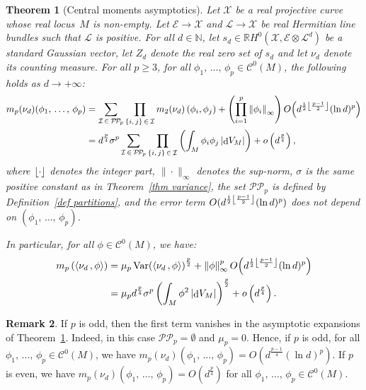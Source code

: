 \documentclass[10pt]{amsart}
\newtheorem{theo}{Theorem}[section]
\theoremstyle{definition}\newtheorem{defi}[theo]{Definition}\newtheorem{rema}[theo]{Remark}\newtheorem{exam}[theo]{Example}\newtheorem{exem}[theo]{Example}\newtheorem{nota}[theo]{Notation}
\DeclareMathOperator{\dmesure}{d}
\DeclareMathOperator{\Var}{Var}
\DeclarePairedDelimiter{\floor}{\lfloor}{\rfloor}
\newcommand{\E}{\mathcal{E}}
\newcommand{\I}{\mathcal{I}}
\newcommand{\X}{\mathcal{X}}
\renewcommand{\L}{\mathcal{L}}
\newcommand{\clC}{\mathcal{C}}
\newcommand{\pp}{\mathcal{P\!P}\!}
\newcommand{\N}{\mathbb{N}}
\newcommand{\R}{\mathbb{R}}
\newcommand{\norm}[1]{\left\lvert #1 \right\rvert}
\newcommand{\Norm}[1]{\left\lVert #1 \right\rVert}
\newcommand{\prsc}[2]{\left\langle #1\,, #2 \right\rangle}
\newcommand{\rmes}[1]{\norm{\dmesure\! V_{#1}}}
\newcommand{\var}[1]{\Var\!\left(#1 \right)}
\renewcommand{\H}{H^0(\X,\E \otimes \L^d)}
\renewcommand{\geq}{\geqslant}
\begin{document}
\begin{theo}[Central moments asymptotics]\label{thm main}
Let $\X$ be a real projective curve whose real locus~$M$ is non-empty. Let $\E \to \X$ and $\L \to \X$ be real Hermitian line bundles such that $\L$ is positive. For all $d \in \N$, let $s_d \in \R\H$ be a standard Gaussian vector, let $Z_d$ denote the real zero set of $s_d$ and let $\nu_d$ denote its counting measure. For all $p \geq 3$, for all $\phi_1,\,\dots,\,\phi_p \in \clC^0(M)$, the following holds as $d \to +\infty$:
\begin{align*}
m_p(\nu_d)(\phi_1,\,\dots,\,\phi_p) &= \sum_{\I\,\in\,\pp_p} \prod_{\{i,\,j\} \,\in\,\I} m_2(\nu_d)\left(\phi_i,\phi_j\right) + \left(\prod_{i=1}^p \Norm{\phi_i}_\infty\right) O\!\left(d^{\frac{1}{2}\floor*{\frac{p-1}{2}}}(\ln d)^p\right)\\
&= d^\frac{p}{4}\sigma^p \sum_{\I\,\in\, \pp_p} \prod_{\{i,\,j\}\,\in\,\I} \left(\int_M \phi_i\phi_j \rmes{M}\right) + o\left(d^\frac{p}{4}\right),
\end{align*}
where $\floor*{\cdot}$ denotes the integer part, $\|\cdot\|_\infty$ denotes the sup-norm, $\sigma$ is the same positive constant as in Theorem~\ref{thm variance}, the set $\pp_p$ is defined by Definition~\ref{def partitions}, and the error term $O(d^{\frac{1}{2}\floor*{\frac{p-1}{2}}}(\ln d)^p)$ does not depend on $(\phi_1,\,\dots,\,\phi_p)$.

In particular, for all $\phi \in \clC^0(M)$, we have:
\begin{align*}
m_p\left(\prsc{\nu_d}{\phi}\right) &= \mu_p \var{\prsc{\nu_d}{\phi}}^\frac{p}{2} + \Norm{\phi}_\infty^p O\!\left(d^{\frac{1}{2}\floor*{\frac{p-1}{2}}}(\ln d)^p\right)\\
&= \mu_p d^\frac{p}{4}\sigma^p \left(\int_M \phi^2 \rmes{M}\right)^\frac{p}{2} + o\left(d^\frac{p}{4}\right).
\end{align*}
\end{theo}


\begin{rema}\label{rem main thm}
If $p$ is odd, then the first term vanishes in the asymptotic expansions of Theorem~\ref{thm main}. Indeed, in this case $\pp_p = \emptyset$ and $\mu_p = 0$. Hence, if $p$ is odd, for all $\phi_1,\,\dots,\,\phi_p \in \clC^0(M)$, we have $m_p(\nu_d)(\phi_1,\,\dots,\,\phi_p) = O(d^{\frac{p-1}{4}}(\ln d)^p)$. If $p$ is even, we have $m_p(\nu_d)(\phi_1,\,\dots,\,\phi_p) = O(d^{\frac{p}{4}})$ for all $\phi_1,\,\dots,\,\phi_p \in \clC^0(M)$.
\end{rema}
\end{document}
